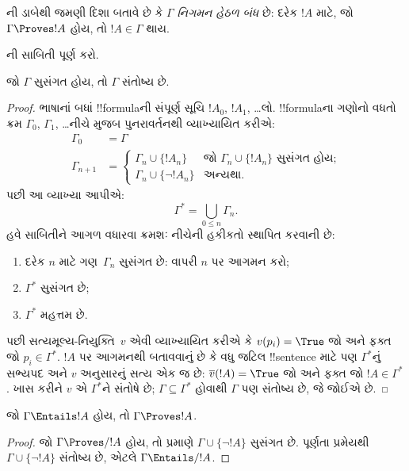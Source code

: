 \documentclass[../../../include/open-logic-section]{subfiles}
\begin{document}
ની ડાબેથી જમણી દિશા
બતાવે છે કે $\Gamma$ \emph{નિગમન હેઠળ બંધ} છે:
દરેક $!A$ માટે, જો $\Gamma \Proves !A$ હોય, તો $!A
\in \Gamma$ થાય.

\begin{prob}
  ની સાબિતી પૂર્ણ કરો.
\end{prob}

\begin{thm}[પૂર્ણતા]
જો $\Gamma$ સુસંગત હોય, તો $\Gamma$ સંતોષ્ય છે.
\end{thm}

\begin{proof}
ભાષાનાં બધાં !!{formula}ની સંપૂર્ણ સૂચિ $!A_0$, $!A_1$,
\dots લો. !!{formula}ના ગણોનો વધતો ક્રમ
$\Gamma_0$, $\Gamma_1$, \dots નીચે મુજબ પુનરાવર્તનથી વ્યાખ્યાયિત કરીએ:
\begin{align*}
\Gamma_0 & = \Gamma\\
\Gamma_{n+1} &  =
\begin{cases}
  \Gamma_n \cup \{!A_n\} & \text{જો $\Gamma_n \cup \{!A_n\}$ સુસંગત હોય;}\\
  \Gamma_n \cup \{\lnot !A_n\} & \text{અન્યથા}.
\end{cases}
\end{align*}
પછી આ વ્યાખ્યા આપીએ:
\[
\Gamma^* = \bigcup_{0\le n}\Gamma_n.
\]
હવે સાબિતીને આગળ વધારવા ક્રમશઃ નીચેની હકીકતો સ્થાપિત કરવાની છે:
\begin{enumerate}
\item દરેક $n$ માટે ગણ~$\Gamma_n$ સુસંગત છે:
   વાપરી
  $n$ પર આગમન કરો;
\item $\Gamma^*$ સુસંગત છે;
\item $\Gamma^*$ મહત્તમ છે.
\end{enumerate}
પછી સત્યમૂલ્ય-નિયુક્તિ~$v$ એવી વ્યાખ્યાયિત કરીએ કે
$v(p_i) = \True$ જો અને ફક્ત જો $p_i \in \Gamma^*$.
$!A$ પર આગમનથી બતાવવાનું છે કે વધુ જટિલ !!{sentence}
માટે પણ $\Gamma^*$નું સભ્યપદ અને $v$ અનુસારનું સત્ય એક જ છે:
$\overline{v}(!A) = \True$ જો અને ફક્ત જો $!A \in \Gamma^*$.
ખાસ કરીને $v$ એ $\Gamma^*$ને સંતોષે છે;
$\Gamma \subseteq \Gamma^*$ હોવાથી $\Gamma$ પણ સંતોષ્ય છે,
જે જોઈએ છે.
\end{proof}

\begin{cor}
જો $\Gamma \Entails !A$ હોય, તો $\Gamma \Proves !A$.
\end{cor}

\begin{proof}
જો $\Gamma\Proves/ !A$ હોય, તો
 પ્રમાણે
$\Gamma \cup \{\lnot !A\}$ સુસંગત છે.
પૂર્ણતા પ્રમેયથી $\Gamma \cup
\{\lnot !A\}$ સંતોષ્ય છે, એટલે $\Gamma \Entails/ !A$.
\end{proof}
\end{document}
